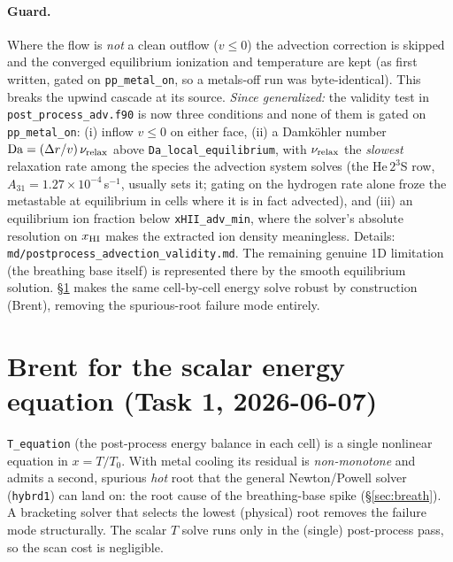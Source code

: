 \documentclass[english,a4paper]{my_memo}
\begin{document}
\paragraph{Guard.} Where the flow is \emph{not} a clean outflow ($v\le0$) the
advection correction is skipped and the converged equilibrium ionization and
temperature are kept (as first written, gated on \texttt{pp\_metal\_on}, so a
metals-off run was byte-identical).
This breaks the upwind cascade at its source.
\emph{Since generalized:} the validity test in
\texttt{post\_process\_adv.f90} is now three conditions and none of them is
gated on \texttt{pp\_metal\_on}: (i) inflow $v\le0$ on either face,
(ii) a Damk\"ohler number $\mathrm{Da}=(\Delta r/v)\,\nu_{\rm relax}$ above
\texttt{Da\_local\_equilibrium}, with $\nu_{\rm relax}$ the \emph{slowest}
relaxation rate among the species the advection system solves (the He\,$2^3$S
row, $A_{31}=1.27\times10^{-4}$\,s$^{-1}$, usually sets it; gating on the
hydrogen rate alone froze the metastable at equilibrium in cells where it is
in fact advected), and (iii) an equilibrium ion fraction below
\texttt{xHII\_adv\_min}, where the solver's absolute resolution on $x_{\rm HI}$
makes the extracted ion density meaningless. Details:
\texttt{md/postprocess\_advection\_validity.md}. The remaining genuine 1D limitation
(the breathing base itself) is represented there by the smooth equilibrium
solution. \S\ref{sec:task1} makes the same cell-by-cell energy solve robust by
construction (Brent), removing the spurious-root failure mode entirely.

\section{Brent for the scalar energy equation (Task 1, 2026-06-07)}\label{sec:task1}
\texttt{T\_equation} (the post-process energy balance in each cell) is a single
nonlinear equation in $x=T/T_0$. With metal cooling its residual is
\emph{non-monotone} and admits a second, spurious \emph{hot} root that the general
Newton/Powell solver (\texttt{hybrd1}) can land on: the root cause of the
breathing-base spike (\S\ref{sec:breath}). A bracketing solver that selects the
lowest (physical) root removes the failure mode structurally. The scalar $T$ solve
runs only in the (single) post-process pass, so the scan cost is negligible.
\end{document}
